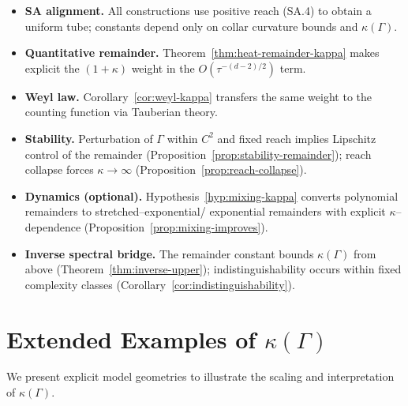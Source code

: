 \begin{itemize}
\item \textbf{SA alignment.} All constructions use positive reach (SA.4) to obtain a uniform tube; constants depend only on collar curvature bounds and $\kappa(\Gamma)$.
\item \textbf{Quantitative remainder.} Theorem~\ref{thm:heat-remainder-kappa} makes explicit the $(1+\kappa)$ weight in the $O(\tau^{-(d-2)/2})$ term.
\item \textbf{Weyl law.} Corollary~\ref{cor:weyl-kappa} transfers the same weight to the counting function via Tauberian theory.
\item \textbf{Stability.} Perturbation of $\Gamma$ within $C^2$ and fixed reach implies Lipschitz control of the remainder (Proposition~\ref{prop:stability-remainder}); reach collapse forces $\kappa\to\infty$ (Proposition~\ref{prop:reach-collapse}).
\item \textbf{Dynamics (optional).} Hypothesis~\ref{hyp:mixing-kappa} converts polynomial remainders to stretched–exponential/ exponential remainders with explicit $\kappa$–dependence (Proposition~\ref{prop:mixing-improves}).
\item \textbf{Inverse spectral bridge.} The remainder constant bounds $\kappa(\Gamma)$ from above (Theorem~\ref{thm:inverse-upper}); indistinguishability occurs within fixed complexity classes (Corollary~\ref{cor:indistinguishability}).
\end{itemize}

\bigskip


\section{Extended Examples of $\kappa(\Gamma)$}
\label{sec:examples-complexity}

We present explicit model geometries to illustrate the scaling and interpretation of $\kappa(\Gamma)$.

